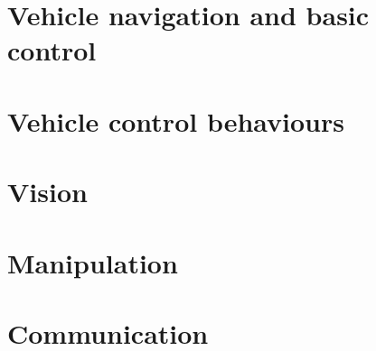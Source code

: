 \documentclass[10pt]{article}
\begin{document}
\maketitle

\tableofcontents

\section{Vehicle navigation and basic control}
















\section{Vehicle control behaviours}









\section{Vision}









\section{Manipulation}







\section{Communication}


\end{document}
